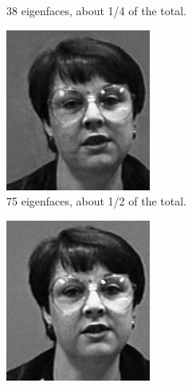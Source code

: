 \begin{figure}
\begin{subfigure}[b]{0.3\textwidth}
    \caption{38 eigenfaces, about 1/4 of the total.}
    \label{fig:38_efaces}
\end{subfigure}
\begin{subfigure}[b]{0.3\textwidth}
    \includegraphics[width=\textwidth]{figures/rebuiltHalf.png}
    \caption{75 eigenfaces, about 1/2 of the total.}
    \label{fig:75_efaces}
\end{subfigure}
\begin{subfigure}[b]{0.3\textwidth}
    \includegraphics[width=\textwidth]{figures/rebuiltAll.png}

\end{subfigure}
\end{figure}
